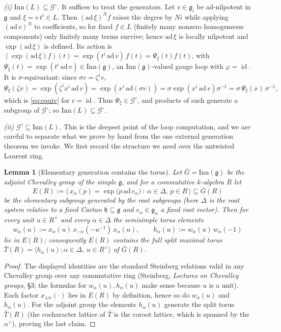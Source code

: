 \documentclass{amsart}
\newtheorem{lemma}{Lemma}
\theoremstyle{definition}
\DeclareMathOperator{\id}{id}
\newcommand{\g}{\mathfrak{g}}
\begin{document}
\emph{(i) $\mathrm{Inn}(L)\subseteq\mathcal G^\circ$.}  It suffices to treat
the generators.  Let $v\in\g_{\bar i}$ be ad-nilpotent in $\g$ and
$\xi=v\,t^{i}\in L$.  Then $(\mathrm{ad}\,\xi)^N f$ raises the degree by
$Ni$ while applying $(\mathrm{ad}\,v)^N$ to coefficients, so for fixed
$f\in L$ (finitely many nonzero homogeneous components) only finitely many
terms survive; hence $\mathrm{ad}\,\xi$ is locally nilpotent and
$\exp(\mathrm{ad}\,\xi)$ is defined.  Its action is
$(\exp(\mathrm{ad}\,\xi)f)(t)=\exp(t^i\,\mathrm{ad}\,v)\,f(t)=\Psi_\xi(t)
f(t)$, with $\Psi_\xi(t)=\exp(t^i\,\mathrm{ad}\,v)\in\mathrm{Inn}(\g)$, an
$\mathrm{Inn}(\g)$-valued gauge loop with $\varphi=\id$.  It is
$\sigma$-equivariant: since $\sigma v=\zeta^{i}v$,
\[
\Psi_\xi(\zeta x)=\exp(\zeta^i x^i\,\mathrm{ad}\,v)
=\exp(x^i\,\mathrm{ad}(\sigma v))
=\sigma\exp(x^i\,\mathrm{ad}\,v)\sigma^{-1}=\sigma\,\Psi_\xi(x)\,\sigma^{-1},
\]
which is \eqref{eq:equiv} for $c=\id$.  Thus $\Psi_\xi\in\mathcal G^\circ$,
and products of such generate a subgroup of $\mathcal G^\circ$; so
$\mathrm{Inn}(L)\subseteq\mathcal G^\circ$.

\emph{(ii) $\mathcal G^\circ\subseteq\mathrm{Inn}(L)$.}  This is the
deepest point of the loop computation, and we are careful to separate what we
prove by hand from the one external generation theorem we invoke.  We first
record the structure we need over the untwisted Laurent ring.

\begin{lemma}[Elementary generation contains the torus]\label{lem:steinberg}
Let $\bar G=\mathrm{Inn}(\g)$ be the adjoint Chevalley group of the simple
$\g$, and for a commutative $k$-algebra $R$ let
\[
E(R):=\bigl\langle\, x_\alpha(p)=\exp\bigl(p\,\mathrm{ad}\,e_\alpha\bigr)\ :\
\alpha\in\Delta,\ p\in R\,\bigr\rangle\subseteq\bar G(R)
\]
be the elementary subgroup generated by the root subgroups (here $\Delta$ is
the root system relative to a fixed Cartan $\mathfrak h\subseteq\g$ and
$e_\alpha\in\g_\alpha$ a fixed root vector).  Then for every unit $u\in
R^\times$ and every $\alpha\in\Delta$ the semisimple torus elements
\[
w_\alpha(u):=x_\alpha(u)\,x_{-\alpha}(-u^{-1})\,x_\alpha(u),\qquad
h_\alpha(u):=w_\alpha(u)\,w_\alpha(-1)
\]
lie in $E(R)$; consequently $E(R)$ contains the full split maximal torus
$\bar T(R)=\langle h_\alpha(u):\alpha\in\Delta,\ u\in R^\times\rangle$ of
$\bar G(R)$.
\end{lemma}
\begin{proof}
The displayed identities are the standard Steinberg relations valid in any
Chevalley group over any commutative ring (Steinberg, \emph{Lectures on
Chevalley groups}, \S3; the formulas for $w_\alpha(u),h_\alpha(u)$ make sense
because $u$ is a unit).  Each factor $x_{\pm\alpha}(\cdot)$ lies in $E(R)$ by
definition, hence so do $w_\alpha(u)$ and $h_\alpha(u)$.  For the adjoint
group the elements $h_\alpha(u)$ generate the split torus $\bar T(R)$ (the
cocharacter lattice of $\bar T$ is the coroot lattice, which is spanned by
the $\alpha^\vee$), proving the last claim.
\end{proof}
\end{document}
